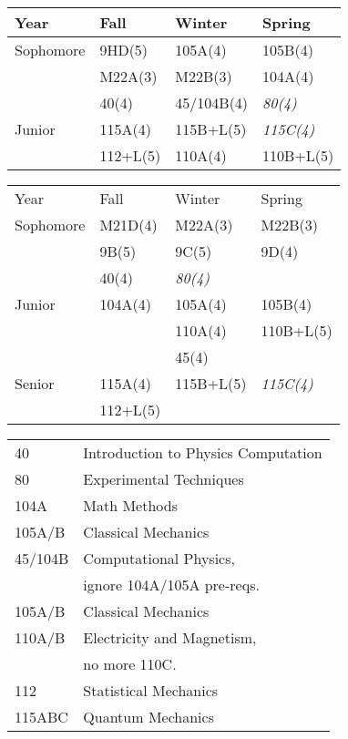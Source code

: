 \documentclass[12pt]{article}
\begin{document}
\newpage


\newpage

\begin{center}
\begin{tabular}{|l|l|l|l|}
\hline
Year      & Fall    & Winter & Spring \\
\hline
Sophomore & 9HD(5)        & 105A(4)       & 105B(4)  \\
          & M22A(3)       & M22B(3)       & 104A(4)  \\
          & 40(4)         & 45/104B(4)       & {\it 80(4)} \\
\hline
Junior    & 115A(4) & 115B+L(5)  & {\it 115C(4)}\\
          & 112+L(5)  & 110A(4)  & 110B+L(5)\\
\hline 
\end{tabular}
\vskip 1cm
\end{center}

\begin{center}
\begin{tabular}{|l|l|l|l|}
\hline
Year      & Fall    & Winter & Spring \\
Sophomore & M21D(4)  & M22A(3)  & M22B(3)\\ 
          & 9B(5)    & 9C(5)    & 9D(4) \\
          & 40(4)    & {\it 80(4)} &  \\
\hline 
Junior   & 104A(4)   & 105A(4) & 105B(4) \\
         &           & 110A(4) & 110B+L(5) \\         
         &           & 45(4)   & \\
\hline
Senior   & 115A(4)    & 115B+L(5)     & {\it 115C(4)} \\
         & 112+L(5)   &               &  \\
\hline
\end{tabular}
\end{center}

\begin{center}
\begin{tabular}{|l|l|}
\hline
40 & Introduction to Physics Computation \\ 
80 & Experimental Techniques \\
104A & Math Methods \\
105A/B & Classical Mechanics \\
45/104B & Computational Physics, \\
& ignore 104A/105A pre-reqs. \\
105A/B & Classical Mechanics \\
110A/B & Electricity and Magnetism, \\
& no more 110C. \\
112 & Statistical Mechanics \\
115ABC & Quantum Mechanics \\
\hline
\end{tabular}
\end{center}
\end{document}
